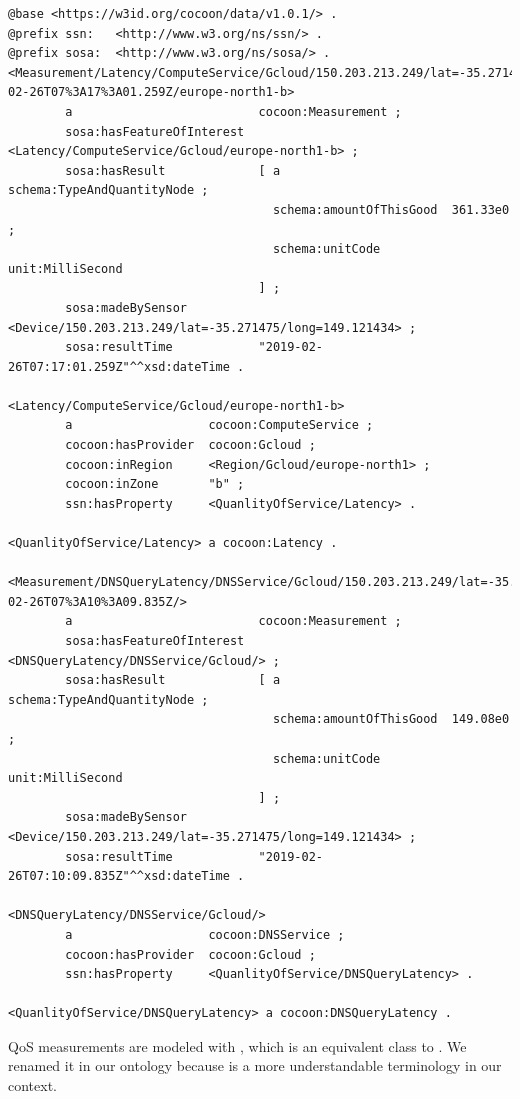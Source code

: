 \begin{lstlisting}[caption={Latency},label={lst:Latency}]
@base <https://w3id.org/cocoon/data/v1.0.1/> .
@prefix ssn:   <http://www.w3.org/ns/ssn/> .
@prefix sosa:  <http://www.w3.org/ns/sosa/> .
<Measurement/Latency/ComputeService/Gcloud/150.203.213.249/lat=-35.271475/long=149.121434/2019-02-26T07%3A17%3A01.259Z/europe-north1-b>
        a                          cocoon:Measurement ;
        sosa:hasFeatureOfInterest  <Latency/ComputeService/Gcloud/europe-north1-b> ;
        sosa:hasResult             [ a                        schema:TypeAndQuantityNode ;
                                     schema:amountOfThisGood  361.33e0 ;
                                     schema:unitCode          unit:MilliSecond
                                   ] ;
        sosa:madeBySensor          <Device/150.203.213.249/lat=-35.271475/long=149.121434> ;
        sosa:resultTime            "2019-02-26T07:17:01.259Z"^^xsd:dateTime .

<Latency/ComputeService/Gcloud/europe-north1-b>
        a                   cocoon:ComputeService ;
        cocoon:hasProvider  cocoon:Gcloud ;
        cocoon:inRegion     <Region/Gcloud/europe-north1> ;
        cocoon:inZone       "b" ;
        ssn:hasProperty     <QuanlityOfService/Latency> .

<QuanlityOfService/Latency> a cocoon:Latency .

<Measurement/DNSQueryLatency/DNSService/Gcloud/150.203.213.249/lat=-35.271475/long=149.121434/2019-02-26T07%3A10%3A09.835Z/>
        a                          cocoon:Measurement ;
        sosa:hasFeatureOfInterest  <DNSQueryLatency/DNSService/Gcloud/> ;
        sosa:hasResult             [ a                        schema:TypeAndQuantityNode ;
                                     schema:amountOfThisGood  149.08e0 ;
                                     schema:unitCode          unit:MilliSecond
                                   ] ;
        sosa:madeBySensor          <Device/150.203.213.249/lat=-35.271475/long=149.121434> ;
        sosa:resultTime            "2019-02-26T07:10:09.835Z"^^xsd:dateTime .

<DNSQueryLatency/DNSService/Gcloud/>
        a                   cocoon:DNSService ;
        cocoon:hasProvider  cocoon:Gcloud ;
        ssn:hasProperty     <QuanlityOfService/DNSQueryLatency> .

<QuanlityOfService/DNSQueryLatency> a cocoon:DNSQueryLatency .
\end{lstlisting}

\label{sec:Measurements}
QoS measurements are modeled with , which is an
equivalent class to . We renamed it in our ontology because  is a more understandable terminology in our context.

